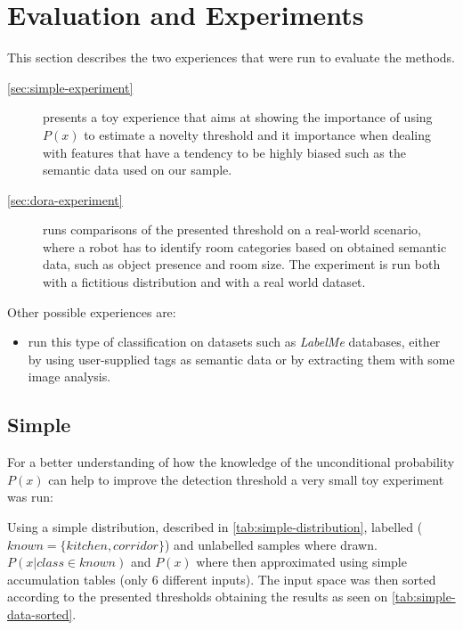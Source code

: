\documentclass[a4paper]{article}
\begin{document}
\clearpage
\section{Evaluation and Experiments}
\label{sec:experiment}

This section describes the two experiences that were run to evaluate the methods.
\begin{description}
\item[\autoref{sec:simple-experiment}] presents a toy experience that aims at
  showing the importance of using $P(x)$ to estimate a novelty threshold and
  it importance when dealing with features that have a tendency to be highly
  biased such as the semantic data used on our sample.

\item[\autoref{sec:dora-experiment}] runs comparisons of the presented threshold
  on a real-world scenario, where a robot has to identify room categories based
  on obtained semantic data, such as object presence and room size.
  The experiment is run both with a fictitious distribution and with a real world
  dataset.
\end{description}

Other possible experiences are:
\begin{itemize}
\item run this type of classification on datasets such as \emph{LabelMe} databases,
  either by using user-supplied tags as semantic data or by extracting them with some
  image analysis.
\end{itemize}


\subsection{Simple}\label{sec:simple-experiment}
For a better understanding of how the knowledge of the unconditional probability $P(x)$ can help to improve the detection threshold
a very small toy experiment was run:

Using a simple distribution, described in \autoref{tab:simple-distribution},
labelled ($known = \{kitchen, corridor\}$)
and unlabelled samples where drawn.
$P(x|class \in known)$ and $P(x)$ where then approximated using simple accumulation tables
(only 6 different inputs).
The input space was then sorted according to the presented thresholds obtaining
the results as seen on \autoref{tab:simple-data-sorted}.
\end{document}
